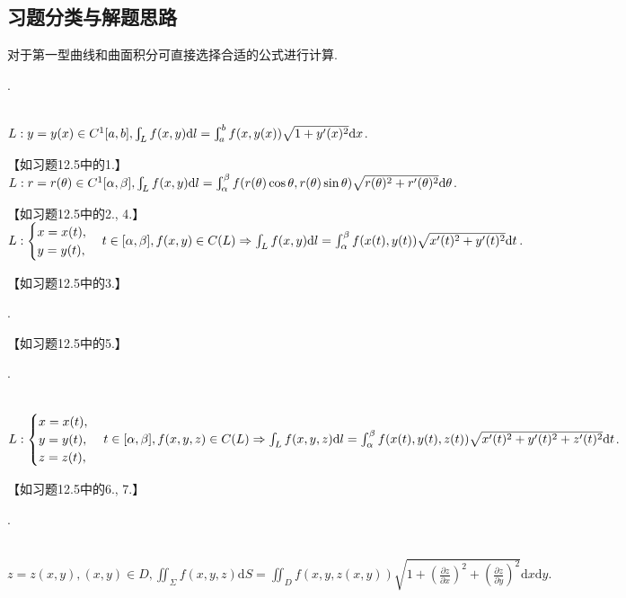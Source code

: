 \documentclass[12pt,UTF8]{ctexart}
\begin{document}
\subsection{习题分类与解题思路}
对于第一型曲线和曲面积分可直接选择合适的公式进行计算.
\begin{enumerate}
.
\begin{enumerate}
\begin{enumerate}
\\
$L: y=y(x)\in C^1[a,b],\varint_Lf(x,y)\mathrm dl=\varint_a^bf(x,y(x))\sqrt{1+y'(x)^2}\mathrm dx$.

【如习题12.5中的1.】
\\
$L: r=r(\theta)\in C^1[\alpha,\beta], \varint_Lf(x,y)\mathrm dl=\varint_\alpha^\beta f(r(\theta)\cos\theta,r(\theta)\sin\theta)\sqrt{r(\theta)^2+r'(\theta)^2}\mathrm d\theta$.

【如习题12.5中的2., 4.】
\\
$L:\begin{cases}x=x(t),\\ y=y(t),\end{cases}t\in[\alpha,\beta],f(x,y)\in C(L)\\
\Rightarrow\int_Lf(x,y)\mathrm dl=\int_\alpha^\beta f(x(t),y(t))\sqrt{x'(t)^2+y'(t)^2}\mathrm dt$.

【如习题12.5中的3.】
\end{enumerate}
.

【如习题12.5中的5.】
\end{enumerate}
.
\begin{enumerate}
\\
$L:\begin{cases}x=x(t),\\ y=y(t),\\ z=z(t),\end{cases}t\in[\alpha,\beta],f(x,y,z)\in C(L)\\
\Rightarrow\int_Lf(x,y,z)\mathrm dl=\int_\alpha^\beta f(x(t),y(t),z(t))\sqrt{x'(t)^2+y'(t)^2+z'(t)^2}\mathrm dt$.

【如习题12.5中的6., 7.】
\end{enumerate}
.
\begin{enumerate}
\\
$z=z(x,y),(x,y)\in D,\iint_\Sigma f(x,y,z)\mathrm dS=\iint_Df(x,y,z(x,y))\sqrt{1+(\frac{\partial z}{\partial x})^2+(\frac{\partial z}{\partial y})^2}\mathrm dx\mathrm dy$.


\end{enumerate}
\end{enumerate}
\end{document}
